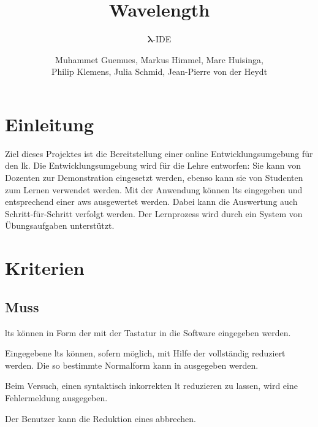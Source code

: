 \documentclass[parskip=full,11pt,twoside]{scrartcl}
\title{Wavelength}
\subtitle{$\bm{\lambda}$-IDE}
\author{Muhammet Guemues, Markus Himmel, Marc Huisinga,\\Philip Klemens, Julia Schmid, Jean-Pierre von der Heydt}
\begin{document}
\maketitle
\pagebreak

\tableofcontents
\pagebreak

\section{Einleitung}
Ziel dieses Projektes ist die Bereitstellung einer online Entwicklungsumgebung für den \gls{lk}. 
Die Entwicklungsumgebung wird für die Lehre entworfen: 
Sie kann von Dozenten zur Demonstration eingesetzt werden, ebenso kann sie von Studenten zum Lernen verwendet werden.
Mit der Anwendung können \glspl{lt} eingegeben und entsprechend einer \gls{aws} ausgewertet werden.
Dabei kann die Auswertung auch Schritt-für-Schritt verfolgt werden.
Der Lernprozess wird durch ein System von Übungsaufgaben unterstützt.

\pagebreak
\section{Kriterien}

\subsection{Muss}

\glspl{lt} können in Form der 
mit der Tastatur in die Software eingegeben werden.

Eingegebene \glspl{lt} können, sofern möglich, mit Hilfe der  vollständig
reduziert werden. Die so bestimmte Normalform kann in 
ausgegeben werden.

Beim Versuch, einen syntaktisch inkorrekten \gls{lt} reduzieren zu lassen, wird eine
Fehlermeldung ausgegeben.

Der Benutzer kann die Reduktion eines  abbrechen.

\end{document}
